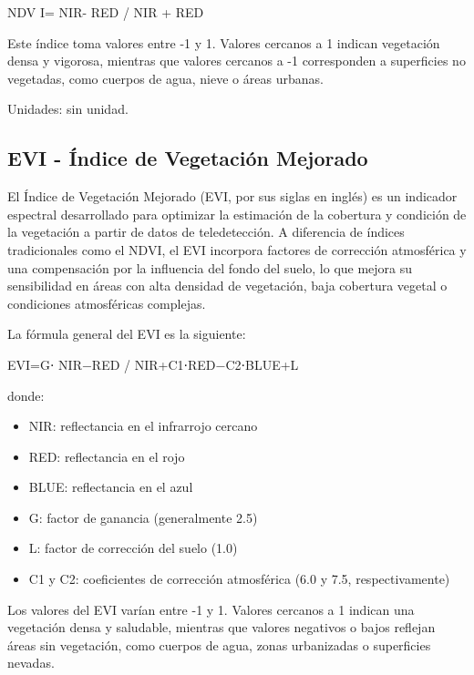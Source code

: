 \documentclass[
]{book}
\providecommand{\tightlist}{%
  \setlength{\itemsep}{0pt}\setlength{\parskip}{0pt}}
\begin{document}
NDV I= NIR- RED / NIR + RED

Este índice toma valores entre -1 y 1. Valores cercanos a 1 indican vegetación densa y vigorosa, mientras que valores cercanos a -1 corresponden a superficies no vegetadas, como cuerpos de agua, nieve o áreas urbanas.

Unidades: sin unidad.

\subsection{\texorpdfstring{\textbf{EVI} - Índice de Vegetación Mejorado}{EVI - Índice de Vegetación Mejorado}}\label{evi---uxedndice-de-vegetaciuxf3n-mejorado}

El Índice de Vegetación Mejorado (EVI, por sus siglas en inglés) es un indicador espectral desarrollado para optimizar la estimación de la cobertura y condición de la vegetación a partir de datos de teledetección. A diferencia de índices tradicionales como el NDVI, el EVI incorpora factores de corrección atmosférica y una compensación por la influencia del fondo del suelo, lo que mejora su sensibilidad en áreas con alta densidad de vegetación, baja cobertura vegetal o condiciones atmosféricas complejas.

La fórmula general del EVI es la siguiente:

EVI=G⋅ NIR−RED / NIR+C1\hspace{0pt}⋅RED−C2\hspace{0pt}⋅BLUE+L

donde:

\begin{itemize}
\tightlist
\item
  NIR: reflectancia en el infrarrojo cercano\\
\item
  RED: reflectancia en el rojo\\
\item
  BLUE: reflectancia en el azul\\
\item
  G: factor de ganancia (generalmente 2.5)\\
\item
  L: factor de corrección del suelo (1.0)\\
\item
  C1 y C2\hspace{0pt}: coeficientes de corrección atmosférica (6.0 y 7.5, respectivamente)
\end{itemize}

Los valores del EVI varían entre -1 y 1. Valores cercanos a 1 indican una vegetación densa y saludable, mientras que valores negativos o bajos reflejan áreas sin vegetación, como cuerpos de agua, zonas urbanizadas o superficies nevadas.
\end{document}
